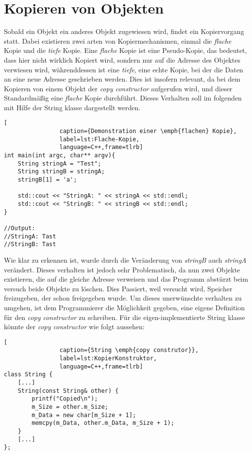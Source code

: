 \section{Kopieren von Objekten}
Sobald ein Objekt ein anderes Objekt zugewiesen wird, findet ein Kopiervorgang statt. Dabei existieren zwei arten von Kopiermechanismen, einmal die \emph{flache} Kopie und die \emph{tiefe} Kopie. Eine \emph{flache} Kopie ist eine Pseudo-Kopie, das bedeutet, dass hier nicht wirklich Kopiert wird, sondern nur auf die Adresse des Objektes verwiesen wird, währenddessen ist eine \emph{tiefe}, eine echte Kopie, bei der die Daten an eine neue Adresse geschrieben werden. Dies ist insofern relevant, da bei dem Kopieren von einem Objekt der \emph{copy constructor} aufgerufen wird, und dieser Standardmäßig eine \emph{flache} Kopie durchführt. Dieses Verhalten soll im folgenden mit Hilfe der String klasse dargestellt werden.

\begin{lstlisting}[
  				caption={Demonstration einer \emph{flachen} Kopie},
  				label=lst:Flache-Kopie,
  				language=C++,frame=tlrb]
int main(int argc, char** argv){
	String stringA = "Test";
	String stringB = stringA;
	stringB[1] = 'a';

	std::cout << "StringA: " << stringA << std::endl;
	std::cout << "StringB: " << stringB << std::endl;
}

//Output:
//StringA: Tast
//StringB: Tast		
			\end{lstlisting}
			
Wie klar zu erkennen ist, wurde durch die Veränderung von \emph{stringB} auch \emph{stringA} verändert. Dieses verhalten ist jedoch sehr Problematisch, da nun zwei Objekte existieren, die auf die gleiche Adresse verweisen und das Programm abstürzt beim versuch beide Objekte zu löschen. Dies Passiert, weil versucht wird, Speicher freizugeben, der schon freigegeben wurde. Um dieses unerwünschte verhalten zu umgehen, ist dem Programmierer die Möglichkeit gegeben, eine eigene Definition für den \emph{copy constructor} zu schreiben. Für die eigen-implementierte String klasse könnte der \emph{copy constructor} wie folgt aussehen:

\begin{lstlisting}[
  				caption={String \emph{copy construtor}},
  				label=lst:KopierKonstruktor,
  				language=C++,frame=tlrb]
class String {
	[...]
    String(const String& other) {
        printf("Copied\n");
        m_Size = other.m_Size;
        m_Data = new char[m_Size + 1];
        memcpy(m_Data, other.m_Data, m_Size + 1);
    }
	[...]
};
			\end{lstlisting}
			
